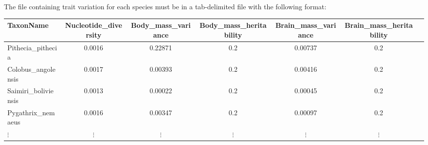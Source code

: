 \documentclass{article}
\begin{document}
The file containing trait variation for each species must be in a tab-delimited file with the following format:
\begin{center}
    \begin{adjustbox}{width = 1.0\textwidth}
        \begin{tabular}{|l|c|c|c|c|c|c|}
            \hline
            TaxonName            & Nucleotide\_diversity & Body\_mass\_variance & Body\_mass\_heritability & Brain\_mass\_variance & Brain\_mass\_heritability \\
            \hline
            Pithecia\_pithecia   & 0.0016                & 0.22871              & 0.2                      & 0.00737               & 0.2                       \\
            Colobus\_angolensis  & 0.0017                & 0.00393              & 0.2                      & 0.00416               & 0.2                       \\
            Saimiri\_boliviensis & 0.0013                & 0.00022              & 0.2                      & 0.00045               & 0.2                       \\
            Pygathrix\_nemaeus   & 0.0016                & 0.00347              & 0.2                      & 0.00097               & 0.2                       \\
            $\vdots$             & $\vdots$              & $\vdots$             & $\vdots$                 & $\vdots$              & $\vdots$                  \\
            \hline
        \end{tabular}
        \label{tab:trait-variance}
    \end{adjustbox}
\end{center}
\end{document}
